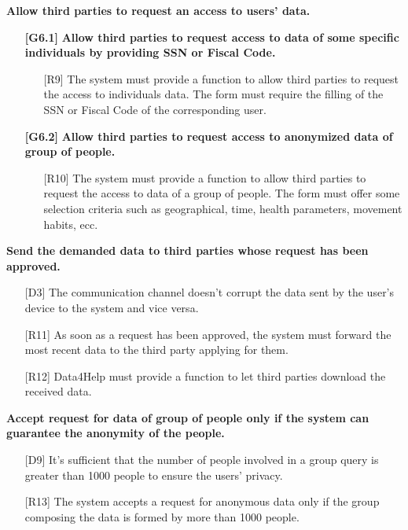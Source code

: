 \begin{enumerate} [label={\bf[G\arabic*]}]
    \item \textbf{Allow third parties to request an access to users' data.}
    \begin{enumerate} [label*={.\arabic*}]
        \item [\bf{[G6.1]}] \textbf{Allow third parties to request access to data of some specific individuals by providing SSN or Fiscal Code.}
            \begin{itemize}
                \item [{[R9]}] The system must provide a function to allow third parties to request the access to individuals data. The form must require the filling of the SSN or Fiscal Code of the corresponding user.
            \end{itemize}
        \item [\bf{[G6.2]}] \textbf{Allow third parties to request access to anonymized data of group of people.}
            \begin{itemize}
                \item [{[R10]}] The system must provide a function to allow third parties to request the access to data of a group of people. The form must offer some selection criteria such as geographical, time, health parameters, movement habits, ecc.
            \end{itemize}
    \end{enumerate}
    
    \item \textbf{Send the demanded data to third parties whose request has been approved.}
        \begin{itemize}
            \item [{[D3]}] The communication channel doesn't corrupt the data sent by the user's device to the system and vice versa.
            \item [{[R11]}] As soon as a request has been approved, the system must forward the most recent data to the third party applying for them.
            \item [{[R12]}] Data4Help must provide a function to let third parties download the received data.
        \end{itemize}
        
        
    \item \textbf{Accept request for data of group of people only if the system can guarantee the anonymity of the people.}
        \begin{itemize}
            \item [{[D9]}] It’s sufficient that the number of people involved in a group query is greater than 1000 people to ensure the users’ privacy.
            \item [{[R13]}] The system accepts a request for anonymous data only if the group composing the data is formed by more than 1000 people.
        \end{itemize}
        

\end{enumerate}
